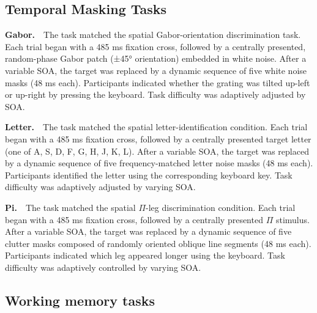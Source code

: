 \documentclass[
  ,man]{apa6}
\begin{document}
\subsection{Temporal Masking Tasks}\label{temporal-masking-tasks}

\textbf{Gabor.}\(\quad\)The task matched the spatial Gabor-orientation discrimination task. Each trial began with a 485 ms fixation cross, followed by a centrally presented, random-phase Gabor patch (±45° orientation) embedded in white noise. After a variable SOA, the target was replaced by a dynamic sequence of five white noise masks (48 ms each). Participants indicated whether the grating was tilted up-left or up-right by pressing the keyboard. Task difficulty was adaptively adjusted by SOA.

\textbf{Letter.}\(\quad\)The task matched the spatial letter-identification condition. Each trial began with a 485 ms fixation cross, followed by a centrally presented target letter (one of A, S, D, F, G, H, J, K, L). After a variable SOA, the target was replaced by a dynamic sequence of five frequency-matched letter noise masks (48 ms each). Participants identified the letter using the corresponding keyboard key. Task difficulty was adaptively adjusted by varying SOA.

\textbf{Pi.}\(\quad\)The task matched the spatial \(\Pi\)-leg discrimination condition. Each trial began with a 485 ms fixation cross, followed by a centrally presented \(\Pi\) stimulus. After a variable SOA, the target was replaced by a dynamic sequence of five clutter masks composed of randomly oriented oblique line segments (48 ms each). Participants indicated which leg appeared longer using the keyboard. Task difficulty was adaptively controlled by varying SOA.

\subsection{Working memory tasks}\label{working-memory-tasks}
\end{document}
